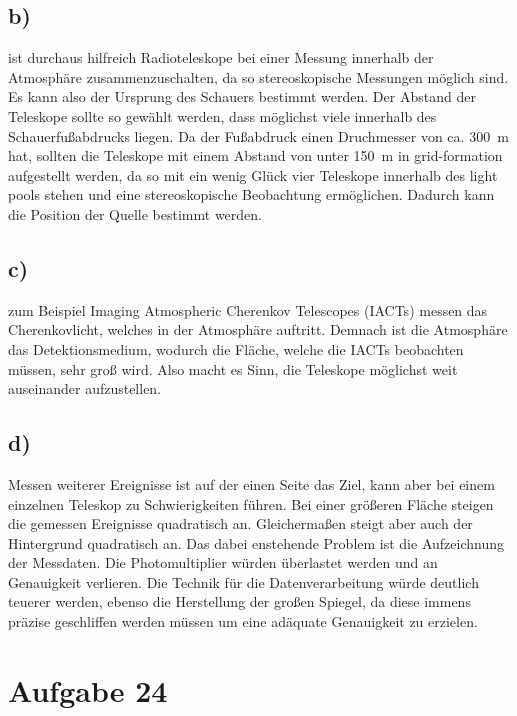 \subsection{b)}

    \justifying ist durchaus hilfreich Radioteleskope bei einer Messung innerhalb der Atmosphäre 
    zusammenzuschalten, da so stereoskopische Messungen möglich sind. Es kann also der Ursprung des Schauers bestimmt
    werden. Der Abstand der Teleskope sollte so gewählt werden, dass möglichst viele innerhalb des Schauerfußabdrucks 
    liegen. Da der Fußabdruck einen Druchmesser von ca. \SI{300}{\meter} hat, sollten die Teleskope mit einem Abstand von unter
    \SI{150}{\meter} in grid-formation aufgestellt werden, da so mit ein wenig Glück vier Teleskope innerhalb des light pools
    stehen und eine stereoskopische Beobachtung ermöglichen. Dadurch kann die Position der Quelle bestimmt werden. 

\subsection{c)}

    \justifying zum Beispiel Imaging Atmospheric Cherenkov Telescopes (IACTs) messen das Cherenkovlicht, welches in der 
    Atmosphäre auftritt. Demnach ist die Atmosphäre das Detektionsmedium, wodurch die Fläche, welche die IACTs beobachten müssen, sehr groß
    wird. Also macht es Sinn, die Teleskope möglichst weit auseinander aufzustellen.  

\subsection{d)}

    \justifying Messen weiterer Ereignisse ist auf der einen Seite das Ziel, kann aber bei einem einzelnen Teleskop zu Schwierigkeiten
    führen. Bei einer größeren Fläche steigen die gemessen Ereignisse quadratisch an. Gleichermaßen steigt aber auch der Hintergrund quadratisch an. 
    Das dabei enstehende Problem ist die Aufzeichnung der Messdaten. Die Photomultiplier würden überlastet werden und an Genauigkeit verlieren. Die
    Technik für die Datenverarbeitung würde deutlich teuerer werden, ebenso die Herstellung der großen Spiegel, da diese immens präzise geschliffen werden 
    müssen um eine adäquate Genauigkeit zu erzielen. 

\section{Aufgabe 24}

